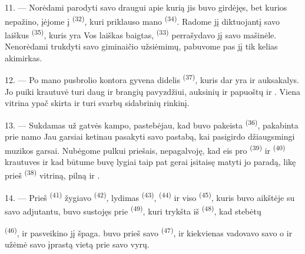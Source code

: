 11. --- Norėdami parodyti savo draugui  apie kurią jis buvo
girdėjęs, bet kurios nepažino, įėjome į  \textsuperscript{(32)}, kuri
priklauso mano  \textsuperscript{(34)}. Radome jį diktuojantį savo
laiškus  \textsuperscript{(35)}, kuris yra  Vos
laiškas baigtas,  \textsuperscript{(33)} perrašydavo jį savo mašinėle.
Nenorėdami trukdyti savo giminaičio užsiėmimų, pabuvome pas jį tik kelias akimirkas.

12. --- Po mano pusbrolio kontora gyvena didelis 
\textsuperscript{(37)}, kuris dar yra ir auksakalys. Jo puiki krautuvė turi daug
 ir brangių  pavyzdžiui,  auksinių  ir  papuoštų
 ir . Viena vitrina ypač skirta
 ir turi svarbų sidabrinių 
rinkinį.

13. --- Sukdamas už gatvės kampo, pastebėjau, kad buvo pakeista 
\textsuperscript{(36)}, pakabinta prie namo  Jau garsiai ketinau
pasakyti savo pastabą, kai pasigirdo džiaugsmingi  muzikos garsai.
Nubėgome pulkui priešais, nepagalvoję, kad  eis pro
 \textsuperscript{(39)} ir 
\textsuperscript{(40)} krautuves ir kad būtume buvę lygiai taip pat gerai įsitaisę
matyti jo paradą, likę prieš  \textsuperscript{(38)} vitriną, pilną
 ir .

\VUsaut{3.0mm}

14. --- Prieš  \textsuperscript{(41)} žygiavo 
\textsuperscript{(42)}, lydimas  \textsuperscript{(43)},
 \textsuperscript{(44)} ir viso 
 \textsuperscript{(45)}, kuris buvo aikštėje su savo adjutantu, buvo
sustojęs prie  \textsuperscript{(49)}, kuri trykšta iš
 \textsuperscript{(48)}, kad stebėtų 

 \textsuperscript{(46)},  ir
 pasveikino jį špaga.  buvo prieš savo
 \textsuperscript{(47)}, ir kiekvienas  vadovavo
savo  o   ir
 užėmė savo įprastą vietą prie savo vyrų.

